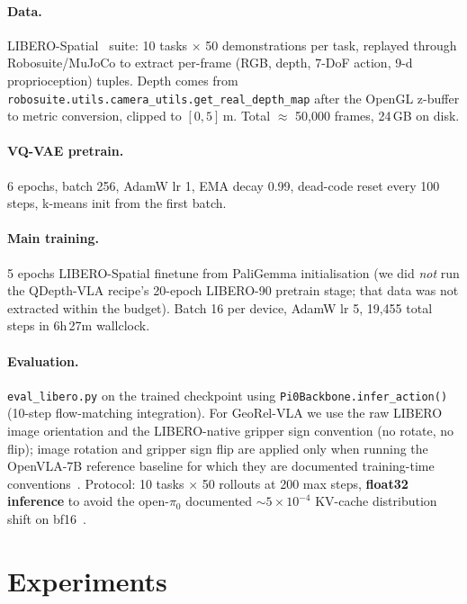 \documentclass{article}
\begin{document}
\paragraph{Data.} LIBERO-Spatial~\citep{liu2023libero} suite: 10 tasks $\times$ 50 demonstrations per task, replayed through Robosuite/MuJoCo to extract per-frame (RGB, depth, 7-DoF action, 9-d proprioception) tuples. Depth comes from \texttt{robosuite.utils.camera\_utils.get\_real\_depth\_map} after the OpenGL z-buffer to metric conversion, clipped to $[0, 5]$\,m. Total $\approx$ 50,000 frames, 24\,GB on disk.

\paragraph{VQ-VAE pretrain.} 6 epochs, batch 256, AdamW lr 1, EMA decay 0.99, dead-code reset every 100 steps, k-means init from the first batch.

\paragraph{Main training.} 5 epochs LIBERO-Spatial finetune from PaliGemma initialisation (we did \emph{not} run the QDepth-VLA recipe's 20-epoch LIBERO-90 pretrain stage; that data was not extracted within the budget). Batch 16 per device, AdamW lr 5, 19,455 total steps in 6h\,27m wallclock.

\paragraph{Evaluation.} \texttt{eval\_libero.py} on the trained checkpoint using \texttt{Pi0Backbone.infer\_action()} (10-step flow-matching integration). For GeoRel-VLA we use the raw LIBERO image orientation and the LIBERO-native gripper sign convention (no rotate, no flip); image rotation and gripper sign flip are applied only when running the OpenVLA-7B reference baseline for which they are documented training-time conventions~\citep{kim2024openvla}. Protocol: 10 tasks $\times$ 50 rollouts at 200 max steps, \textbf{float32 inference} to avoid the open-$\pi_0$ documented $\sim 5{\times}10^{-4}$ KV-cache distribution shift on bf16~\citep{ren2024openpi0}.

\section{Experiments}\label{sec:exp}
\end{document}
